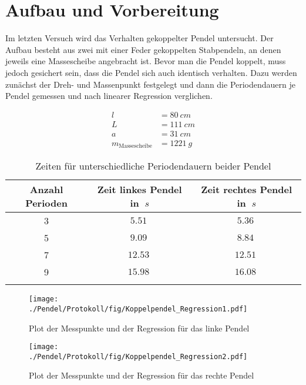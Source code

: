 \section{Aufbau und Vorbereitung}

Im letzten Versuch wird das Verhalten gekoppelter Pendel untersucht. Der Aufbau besteht aus zwei mit einer Feder gekoppelten Stabpendeln, an denen jeweils eine Massescheibe angebracht ist.
Bevor man die Pendel koppelt, muss jedoch gesichert sein, dass die Pendel sich auch identisch verhalten.
Dazu werden zunächst der Dreh- und Massenpunkt festgelegt und dann die Periodendauern je Pendel gemessen und nach linearer Regression verglichen.

\begin{align}
    l &= \SI{80}{cm} \\
    L &= \SI{111}{cm} \\
    a &= \SI{31}{cm} \\
    m_{\text{Massescheibe}} &= \SI{1221}{g}
\end{align}

\begin{table}[h!]
    \begin{center}
        \caption{Zeiten für unterschiedliche Periodendauern beider Pendel}
        \begin{tabular}{ccc}
            \hline
            Anzahl Perioden & Zeit linkes Pendel in $\SI{}{s}$ & Zeit rechtes Pendel in $\SI{}{s}$ \\
            \hline
            3  & $\SI{5,51}{}$ & $\SI{5,36}{}$ \\
            5  & $\SI{9,09}{}$ & $\SI{8,84}{}$  \\
            7  & $\SI{12,53}{}$ & $\SI{12,51}{}$  \\
            9  & $\SI{15,98}{}$ & $\SI{16,08}{}$ \\
            \hline
            \label{tab:Schwingungen-Pendel-einzeln}
        \end{tabular}
    \end{center}
\end{table}

\begin{figure}[h!]
    \centering
    \texttt{[image: ./Pendel/Protokoll/fig/Koppelpendel\_Regression1.pdf]}
    \caption{Plot der Messpunkte und der Regression für das linke Pendel}
    \label{fig:Reg_links}
\end{figure}

\begin{figure}[h!]
    \centering
    \texttt{[image: ./Pendel/Protokoll/fig/Koppelpendel\_Regression2.pdf]}
    \caption{Plot der Messpunkte und der Regression für das rechte Pendel}
    \label{fig:Reg_rechts}
\end{figure}

